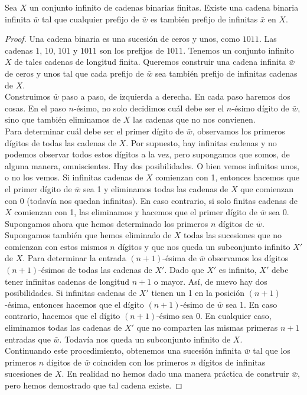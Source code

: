 \message{ !name(main.tex)}\documentclass[12pt,a4paper]{book}
\begin{document}
    \begin{lema}\label{lema:cadenas-binarias}
        Sea $X$ un conjunto infinito de cadenas binarias finitas. Existe una cadena binaria infinita $\bar{w}$ tal que
        cualquier prefijo de $\bar{w}$ es también prefijo de infinitas $\bar{x}$ en $X$.
    \end{lema}
    \begin{proof}
        Una cadena binaria es una sucesión de ceros y unos, como $1011$. Las cadenas $1$, $10$, $101$ y $1011$ son los
        prefijos de $1011$. Tenemos un conjunto infinito $X$ de tales cadenas de longitud finita. Queremos construir una
        cadena infinita $\bar{w}$ de ceros y unos tal que cada prefijo de $\bar{w}$ sea también prefijo de infinitas
        cadenas de $X$.\\
        Construimos $\bar{w}$ paso a paso, de izquierda a derecha. En cada paso haremos dos cosas. En el paso $n$-ésimo, no
        solo decidimos cuál debe ser el $n$-ésimo dígito de $\bar{w}$, sino que también eliminamos de $X$ las cadenas que no
        nos convienen.\\
        Para determinar cuál debe ser el primer dígito de $\bar{w}$, observamos los primeros dígitos de todas las cadenas de
        $X$. Por supuesto, hay infinitas cadenas y no podemos observar todos estos dígitos a la vez, pero supongamos que
        somos, de alguna manera, omniscientes. Hay dos posibilidades. O bien vemos infinitos unos, o no los vemos. Si
        infinitas cadenas de $X$ comienzan con 1, entonces hacemos que el primer dígito de $\bar{w}$ sea 1 y eliminamos
        todas las cadenas de $X$ que comienzan con 0 (todavía nos quedan infinitas). En caso contrario, si solo finitas
        cadenas de $X$ comienzan con 1, las eliminamos y hacemos que el primer dígito de $\bar{w}$ sea 0.\\
        Supongamos ahora que hemos determinado los primeros $n$ dígitos de $\bar{w}$. Supongamos también que hemos
        eliminado de $X$ todas las sucesiones que no comienzan con estos mismos $n$ dígitos y que nos queda un subconjunto
        infinito $X'$ de $X$. Para determinar la entrada $(n+1)$-ésima de $\bar{w}$ observamos los dígitos $(n+1)$-ésimos de
        todas las cadenas de $X'$. Dado que $X'$ es infinito, $X'$ debe tener infinitas cadenas de longitud $n+1$ o mayor.
        Así, de nuevo hay dos posibilidades. Si infinitas cadenas de $X'$ tienen un 1 en la posición $(n+1)$-ésima, entonces
        hacemos que el dígito $(n+1)$-ésimo de $\bar{w}$ sea 1. En caso contrario, hacemos que el dígito $(n+1)$-ésimo sea 0.
        En cualquier caso, eliminamos todas las cadenas de $X'$ que no comparten las mismas primeras $n+1$ entradas que
        $\bar{w}$. Todavía nos queda un subconjunto infinito de $X$.\\
        Continuando este procedimiento, obtenemos una sucesión infinita $\bar{w}$ tal que los primeros $n$ dígitos de
        $\bar{w}$ coinciden con los primeros $n$ dígitos de infinitas sucesiones de $X$. En realidad no hemos dado una
        manera práctica de construir $\bar{w}$, pero hemos demostrado que tal cadena existe.
    \end{proof}
\end{document}

